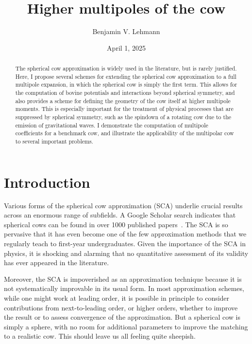 \documentclass[
    prd, twocolumn, nofootinbib, amsmath, amssymb,
    aps, floatfix, preprintnumbers
]{revtex4-2}
\begin{document}
\title{Higher multipoles of the cow}
\author{Benjamin V. Lehmann}

\date{April 1, 2025}

\begin{abstract}\ignorespaces{}
    The spherical cow approximation is widely used in the literature, but is rarely justified. Here, I propose several schemes for extending the spherical cow approximation to a full multipole expansion, in which the spherical cow is simply the first term. This allows for the computation of bovine potentials and interactions beyond spherical symmetry, and also provides a scheme for defining the geometry of the cow itself at higher multipole moments. This is especially important for the treatment of physical processes that are suppressed by spherical symmetry, such as the spindown of a rotating cow due to the emission of gravitational waves. I demonstrate the computation of multipole coefficients for a benchmark cow, and illustrate the applicability of the multipolar cow to several important problems.
\end{abstract}

\maketitle
\section{Introduction}
\label{sec:intro}

Various forms of the spherical cow approximation (SCA) underlie crucial results across an enormous range of subfields. A Google Scholar search indicates that spherical cows can be found in over 1000 published papers~\cite{scholar}. The SCA is so pervasive that it has even become one of the few approximation methods that we regularly teach to first-year undergraduates. Given the importance of the SCA in physics, it is shocking and alarming that no quantitative assessment of its validity has ever appeared in the literature.

Moreover, the SCA is impoverished as an approximation technique because it is not systematically improvable in its usual form. In most approximation schemes, while one might work at leading order, it is possible in principle to consider contributions from next-to-leading order, or higher orders, whether to improve the result or to assess convergence of the approximation. But a spherical cow is simply a sphere, with no room for additional parameters to improve the matching to a realistic cow. This should leave us all feeling quite sheepish.
\end{document}
